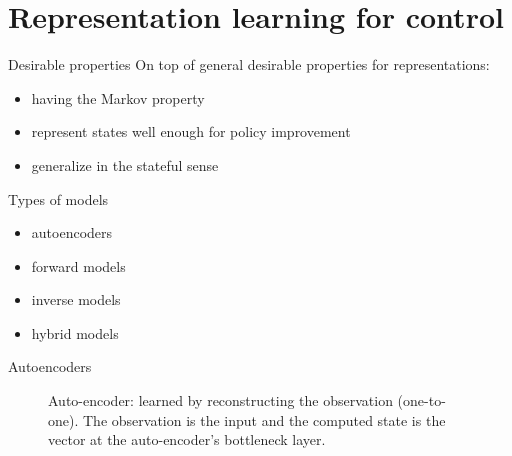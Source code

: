 \documentclass{beamer}
\begin{document}
\section{Representation learning for control} 

\begin{frame}{Desirable properties}
		On top of general desirable properties for representations:
		\begin{itemize}
				\item having the Markov property
				\item represent states well enough for policy improvement
				\item generalize in the stateful sense
		\end{itemize}
\end{frame}


\begin{frame}{Types of models}
		\begin{itemize}
				\item autoencoders
				\item forward models
				\item inverse models
				\item hybrid models
		\end{itemize}
\end{frame}


\begin{frame}{Autoencoders}
\begin{figure}[htpb]
\begin{center}
\end{center}
		\caption{Auto-encoder: learned by reconstructing the observation (one-to-one).
				The observation is the input and the computed state is the vector at
				the auto-encoder's bottleneck layer.}
\end{figure}
\end{frame}
\end{document}
